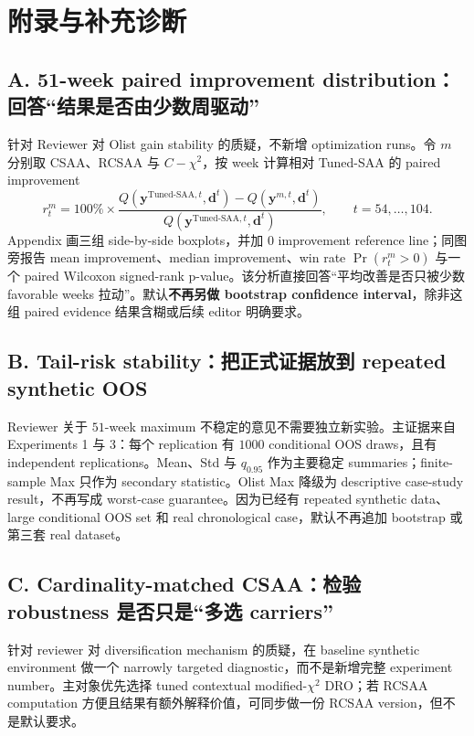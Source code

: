 \documentclass[11pt,a4paper]{ctexart}
\begin{document}
\section{附录与补充诊断}

\subsection{A. 51-week paired improvement distribution：回答“结果是否由少数周驱动”}

针对 Reviewer 对 Olist gain stability 的质疑，不新增 optimization runs。令 $m$ 分别取 CSAA、RCSAA 与 $C\!\!-\chi^2$，按 week 计算相对 Tuned-SAA 的 paired improvement
\[
r_t^m
=100\%\times
\frac{Q(\boldsymbol y^{\mathrm{Tuned\text{-}SAA},t},\boldsymbol d^t)
-Q(\boldsymbol y^{m,t},\boldsymbol d^t)}
{Q(\boldsymbol y^{\mathrm{Tuned\text{-}SAA},t},\boldsymbol d^t)},
\qquad t=54,\ldots,104.
\]
Appendix 画三组 side-by-side boxplots，并加 $0$ improvement reference line；同图旁报告 mean improvement、median improvement、win rate $\Pr(r_t^m>0)$ 与一个 paired Wilcoxon signed-rank p-value。该分析直接回答“平均改善是否只被少数 favorable weeks 拉动”。默认\textbf{不再另做 bootstrap confidence interval}，除非这组 paired evidence 结果含糊或后续 editor 明确要求。

\subsection{B. Tail-risk stability：把正式证据放到 repeated synthetic OOS}

Reviewer 关于 $51$-week maximum 不稳定的意见不需要独立新实验。主证据来自 Experiments 1 与 3：每个 replication 有 $1000$ conditional OOS draws，且有 independent replications。Mean、Std 与 $q_{0.95}$ 作为主要稳定 summaries；finite-sample Max 只作为 secondary statistic。Olist Max 降级为 descriptive case-study result，不再写成 worst-case guarantee。因为已经有 repeated synthetic data、large conditional OOS set 和 real chronological case，默认不再追加 bootstrap 或第三套 real dataset。

\subsection{C. Cardinality-matched CSAA：检验 robustness 是否只是“多选 carriers”}

针对 reviewer 对 diversification mechanism 的质疑，在 baseline synthetic environment 做一个 narrowly targeted diagnostic，而不是新增完整 experiment number。主对象优先选择 tuned contextual modified-$\chi^2$ DRO；若 RCSAA computation 方便且结果有额外解释价值，可同步做一份 RCSAA version，但不是默认要求。
\end{document}
